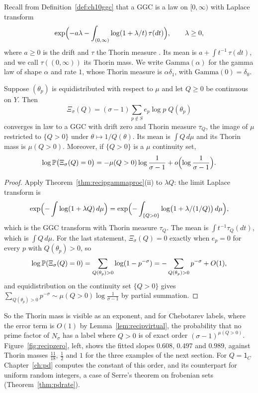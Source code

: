 Recall from Definition~\ref{def:ch10ggc} that a GGC is a law on $[0,\infty)$ with Laplace transform
\[
\exp\Bigl(-a\lambda-\int_{(0,\infty)}\log(1+\lambda/t)\,\tau(dt)\Bigr),\qquad\lambda\ge0,
\]
where $a\ge0$ is the drift and $\tau$ the Thorin measure \cite{thorin1977,bondesson1992}. Its mean is $a+\int t^{-1}\,\tau(dt)$, and we call $\tau((0,\infty))$ its Thorin mass. We write $\mathrm{Gamma}(\alpha)$ for the gamma law of shape $\alpha$ and rate $1$, whose Thorin measure is $\alpha\delta_1$, with $\mathrm{Gamma}(0)=\delta_0$.

\begin{theorem}\label{thm:recipggcfun}
Suppose $(\theta_p)$ is equidistributed with respect to $\mu$ and let $Q\ge0$ be continuous on $Y$. Then
\[
\Xi_\sigma(Q)=(\sigma-1)\sum_{p\notin S}e_p\log p\;Q(\theta_p)
\]
converges in law to a GGC with drift zero and Thorin measure $\tau_Q$, the image of $\mu$ restricted to $\{Q>0\}$ under $\theta\mapsto1/Q(\theta)$. Its mean is $\int Q\,d\mu$ and its Thorin mass is $\mu(Q>0)$. Moreover, if $\{Q>0\}$ is a $\mu$ continuity set,
\[
\log\mathbb{P}\bigl(\Xi_\sigma(Q)=0\bigr)=-\mu(Q>0)\log\frac1{\sigma-1}+o\Bigl(\log\frac1{\sigma-1}\Bigr).
\]
\end{theorem}

\begin{proof}
Apply Theorem~\ref{thm:recipgammaproc}(ii) to $\lambda Q$: the limit Laplace transform is
\[
\exp\Bigl(-\int\log(1+\lambda Q)\,d\mu\Bigr)=\exp\Bigl(-\int_{\{Q>0\}}\log\bigl(1+\lambda/(1/Q)\bigr)\,d\mu\Bigr),
\]
which is the GGC transform with Thorin measure $\tau_Q$. The mean is $\int t^{-1}\tau_Q(dt)$, which is $\int Q\,d\mu$. For the last statement, $\Xi_\sigma(Q)=0$ exactly when $e_p=0$ for every $p$ with $Q(\theta_p)>0$, so
\[
\log\mathbb{P}(\Xi_\sigma(Q)=0)=\sum_{Q(\theta_p)>0}\log(1-p^{-\sigma})=-\sum_{Q(\theta_p)>0}p^{-\sigma}+O(1),
\]
and equidistribution on the continuity set $\{Q>0\}$ gives $\sum_{Q(\theta_p)>0}p^{-\sigma}\sim\mu(Q>0)\log\frac1{\sigma-1}$ by partial summation.
\end{proof}

So the Thorin mass is visible as an exponent, and for Chebotarev labels, where the error term is $O(1)$ by Lemma~\ref{lem:recipvirtual}, the probability that no prime factor of $N_\sigma$ has a label where $Q>0$ is of exact order $(\sigma-1)^{\mu(Q>0)}$. Figure~\ref{fig:recipzero}, left, shows the fitted slopes $0.608$, $0.497$ and $0.989$, against Thorin masses $\frac{11}{18}$, $\frac12$ and $1$ for the three examples of the next section. For $Q=\mathsf 1_C$ Chapter~\ref{ch:pd} computes the constant of this order, and its counterpart for uniform random integers, a case of Serre's theorem on frobenian sets (Theorem~\ref{thm:pdrate}).

